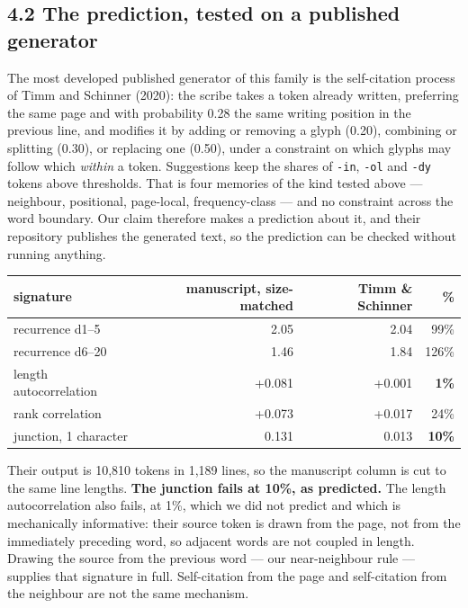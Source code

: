 \documentclass[11pt,a4paper]{article}
\begin{document}
\subsection*{4.2 The prediction, tested on a published generator}


The most developed published generator of this family is the self-citation process of Timm and Schinner (2020): the scribe takes a token already written, preferring the same page and with probability 0.28 the same writing position in the previous line, and modifies it by adding or removing a glyph (0.20), combining or splitting (0.30), or replacing one (0.50), under a constraint on which glyphs may follow which \emph{within} a token. Suggestions keep the shares of \texttt{-in}, \texttt{-ol} and \texttt{-dy} tokens above thresholds. That is four memories of the kind tested above --- neighbour, positional, page-local, frequency-class --- and no constraint across the word boundary. Our claim therefore makes a prediction about it, and their repository publishes the generated text, so the prediction can be checked without running anything.


\begin{table}[htbp]\centering\small
\begin{tabular}{@{}lrrr@{}}
\toprule
signature & manuscript, size-matched & Timm \& Schinner & \% \\
\midrule
recurrence d1--5 & 2.05 & 2.04 & 99\% \\
recurrence d6--20 & 1.46 & 1.84 & 126\% \\
length autocorrelation & +0.081 & +0.001 & \textbf{1\%} \\
rank correlation & +0.073 & +0.017 & 24\% \\
junction, 1 character & 0.131 & 0.013 & \textbf{10\%} \\
\bottomrule
\end{tabular}
\end{table}


Their output is 10,810 tokens in 1,189 lines, so the manuscript column is cut to the same line lengths. \textbf{The junction fails at 10\%, as predicted.} The length autocorrelation also fails, at 1\%, which we did not predict and which is mechanically informative: their source token is drawn from the page, not from the immediately preceding word, so adjacent words are not coupled in length. Drawing the source from the previous word --- our near-neighbour rule --- supplies that signature in full. Self-citation from the page and self-citation from the neighbour are not the same mechanism.
\end{document}

